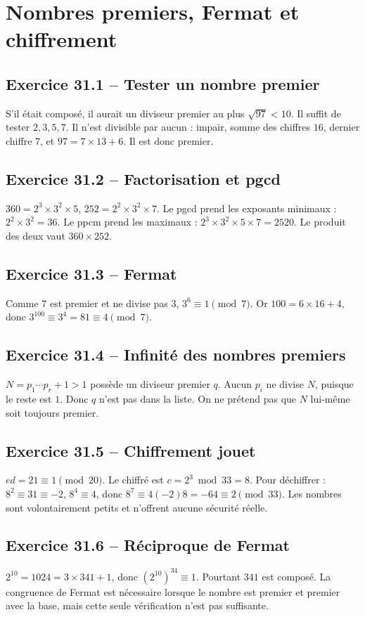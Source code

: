 \chapter{Nombres premiers, Fermat et chiffrement}
\section*{Exercice 31.1 -- Tester un nombre premier}
S'il était composé, il aurait un diviseur premier au plus $\sqrt{97}<10$. Il suffit de tester $2,3,5,7$. Il n'est divisible par aucun : impair, somme des chiffres $16$, dernier chiffre $7$, et $97=7\times13+6$. Il est donc premier.

\section*{Exercice 31.2 -- Factorisation et pgcd}
$360=2^3\times3^2\times5$, $252=2^2\times3^2\times7$. Le pgcd prend les exposants minimaux : $2^2\times3^2=36$. Le ppcm prend les maximaux : $2^3\times3^2\times5\times7=2520$. Le produit des deux vaut $360\times252$.

\section*{Exercice 31.3 -- Fermat}
Comme $7$ est premier et ne divise pas $3$, $3^6\equiv1\pmod7$. Or $100=6\times16+4$, donc $3^{100}\equiv3^4=81\equiv4\pmod7$.

\section*{Exercice 31.4 -- Infinité des nombres premiers}
$N=p_1\cdots p_r+1>1$ possède un diviseur premier $q$. Aucun $p_i$ ne divise $N$, puisque le reste est $1$. Donc $q$ n'est pas dans la liste. On ne prétend pas que $N$ lui-même soit toujours premier.

\section*{Exercice 31.5 -- Chiffrement jouet}
$ed=21\equiv1\pmod{20}$. Le chiffré est $c=2^3\bmod33=8$. Pour déchiffrer : $8^2\equiv31\equiv-2$, $8^4\equiv4$, donc $8^7\equiv4(-2)8=-64\equiv2\pmod{33}$. Les nombres sont volontairement petits et n'offrent aucune sécurité réelle.

\section*{Exercice 31.6 -- Réciproque de Fermat}
$2^{10}=1024=3\times341+1$, donc $(2^{10})^{34}\equiv1$. Pourtant $341$ est composé. La congruence de Fermat est nécessaire lorsque le nombre est premier et premier avec la base, mais cette seule vérification n'est pas suffisante.
